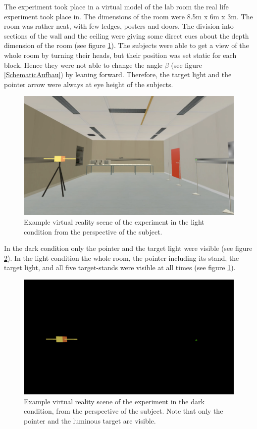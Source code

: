 The experiment took place in a virtual model of the lab room the real life experiment took place in. The dimensions of the room were 8.5m x 6m x 3m. The room was rather neat, with few ledges, posters and doors. The division into sections of the wall and the ceiling were giving some direct cues about the depth dimension of the room (see figure \ref{SceneExampleLight}). The subjects were able to get a view of the whole room by turning their heads, but their position was set static for each block. Hence they were not able to change the angle $\beta$ (see figure \ref{SchematicAufbau}) by leaning forward. Therefore, the target light and the pointer arrow were always at eye height of the subjects. 
\begin{figure}
    \centering
    \includegraphics[width=12cm]{Images/SzenenBeispiel.png}
    \caption{Example virtual reality scene of the experiment in the light condition from the perspective of the subject.} 
    \label{SceneExampleLight}
\end{figure}
In the dark condition only the pointer and the target light were visible (see figure \ref{SceneExampleDark}). In the light condition the whole room, the pointer including its stand, the target light, and all five target-stands were visible at all times (see figure \ref{SceneExampleLight}). 
\begin{figure}
    \centering
    \includegraphics[width=12cm]{Images/SzeneDunkelBeispiel.png}
    \caption{Example virtual reality scene of the experiment in the dark condition, from the perspective of the subject. Note that only the pointer and the luminous target are visible.} 
    \label{SceneExampleDark}
\end{figure}

